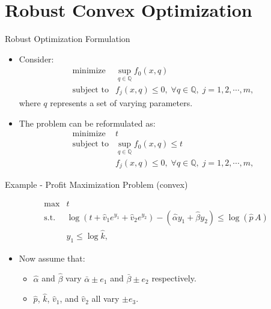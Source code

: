 \documentclass[
  ignorenonframetext,
  aspectratio=169,
  serif,onlymath]{beamer}
\providecommand{\tightlist}{%
  \setlength{\itemsep}{0pt}\setlength{\parskip}{0pt}}
\begin{document}
\hypertarget{robust-convex-optimization}{%
\section{Robust Convex Optimization}\label{robust-convex-optimization}}

\begin{frame}{Robust Optimization Formulation}
\protect\hypertarget{robust-optimization-formulation}{}

\begin{itemize}
\item
  Consider: \[\begin{array}{ll}
      \text{minimize}   & \sup_{q \in \mathbb Q} f_0(x,q) \\
      \text{subject to} & f_j(x,q) \le 0, \;
       \forall q \in {\mathbb Q}, \; j = 1,2,\cdots,m,
    \end{array}\] where \(q\) represents a set of varying parameters.
\item
  The problem can be reformulated as: \[\begin{array}{ll}
      \text{minimize}   & t \\
      \text{subject to} & \sup_{q \in \mathbb Q} f_0(x,q) \le t  \\
      & f_j(x,q) \le 0, \;
       \forall q \in {\mathbb Q}, \; j = 1,2,\cdots,m,
    \end{array}\]
\end{itemize}

\end{frame}

\begin{frame}{Example - Profit Maximization Problem (convex)}
\protect\hypertarget{example---profit-maximization-problem-convex}{}

\[\begin{array}{ll}
\text{max}  & t \\
\text{s.t.} & \log(t + \hat{v}_1 e^{y_1} + \hat{v}_2 e^{y_2}) - (\hat{\alpha} y_1 + \hat{\beta} y_2) \le \log(\hat{p}\,A)  \\
                  & y_1 \le \log \hat{k} ,
\end{array}\]

\begin{itemize}
\tightlist
\item
  Now assume that:

  \begin{itemize}
  \tightlist
  \item
    \(\hat{\alpha}\) and \(\hat{\beta}\) vary \(\bar{\alpha} \pm e_1\)
    and \(\bar{\beta} \pm e_2\) respectively.
  \item
    \(\hat{p}\), \(\hat{k}\), \(\hat{v}_1\), and \(\hat{v}_2\) all vary
    \(\pm e_3\).
  \end{itemize}
\end{itemize}

\end{frame}
\end{document}
